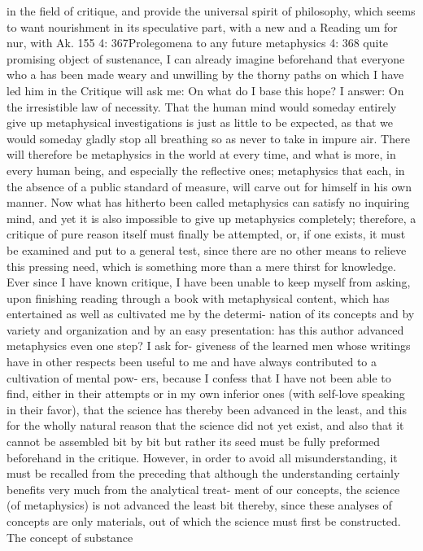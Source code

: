 in the ﬁeld of critique, and provide the universal spirit of philosophy,
which seems to want nourishment in its speculative part, with a new and
a
Reading um for nur, with Ak.
155
4: 367Prolegomena to any future metaphysics
4: 368
quite promising object of sustenance, I can already imagine beforehand
that everyone who a has been made weary and unwilling by the thorny
paths on which I have led him in the Critique will ask me: On what do I
base this hope? I answer: On the irresistible law of necessity.
That the human mind would someday entirely give up metaphysical
investigations is just as little to be expected, as that we would someday
gladly stop all breathing so as never to take in impure air. There will
therefore be metaphysics in the world at every time, and what is more,
in every human being, and especially the reﬂective ones; metaphysics
that each, in the absence of a public standard of measure, will carve
out for himself in his own manner. Now what has hitherto been called
metaphysics can satisfy no inquiring mind, and yet it is also impossible to
give up metaphysics completely; therefore, a critique of pure reason itself
must ﬁnally be attempted, or, if one exists, it must be examined and put
to a general test, since there are no other means to relieve this pressing
need, which is something more than a mere thirst for knowledge.
Ever since I have known critique, I have been unable to keep myself
from asking, upon ﬁnishing reading through a book with metaphysical
content, which has entertained as well as cultivated me by the determi-
nation of its concepts and by variety and organization and by an easy
presentation: has this author advanced metaphysics even one step? I ask for-
giveness of the learned men whose writings have in other respects been
useful to me and have always contributed to a cultivation of mental pow-
ers, because I confess that I have not been able to ﬁnd, either in their
attempts or in my own inferior ones (with self-love speaking in their
favor), that the science has thereby been advanced in the least, and this
for the wholly natural reason that the science did not yet exist, and also
that it cannot be assembled bit by bit but rather its seed must be fully
preformed beforehand in the critique. However, in order to avoid all
misunderstanding, it must be recalled from the preceding that although
the understanding certainly beneﬁts very much from the analytical treat-
ment of our concepts, the science (of metaphysics) is not advanced the
least bit thereby, since these analyses of concepts are only materials, out
of which the science must ﬁrst be constructed. The concept of substance
